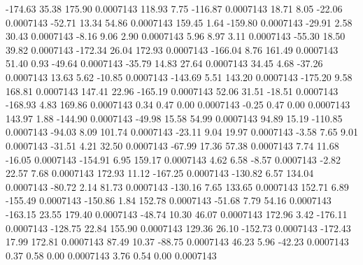      -174.63       35.38      175.90     0.0007143
      118.93        7.75     -116.87     0.0007143
       18.71        8.05      -22.06     0.0007143
      -52.71       13.34       54.86     0.0007143
      159.45        1.64     -159.80     0.0007143
      -29.91        2.58       30.43     0.0007143
       -8.16        9.06        2.90     0.0007143
        5.96        8.97        3.11     0.0007143
      -55.30       18.50       39.82     0.0007143
     -172.34       26.04      172.93     0.0007143
     -166.04        8.76      161.49     0.0007143
       51.40        0.93      -49.64     0.0007143
      -35.79       14.83       27.64     0.0007143
       34.45        4.68      -37.26     0.0007143
       13.63        5.62      -10.85     0.0007143
     -143.69        5.51      143.20     0.0007143
     -175.20        9.58      168.81     0.0007143
      147.41       22.96     -165.19     0.0007143
       52.06       31.51      -18.51     0.0007143
     -168.93        4.83      169.86     0.0007143
        0.34        0.47        0.00     0.0007143
       -0.25        0.47        0.00     0.0007143
      143.97        1.88     -144.90     0.0007143
      -49.98       15.58       54.99     0.0007143
       94.89       15.19     -110.85     0.0007143
      -94.03        8.09      101.74     0.0007143
      -23.11        9.04       19.97     0.0007143
       -3.58        7.65        9.01     0.0007143
      -31.51        4.21       32.50     0.0007143
      -67.99       17.36       57.38     0.0007143
        7.74       11.68      -16.05     0.0007143
     -154.91        6.95      159.17     0.0007143
        4.62        6.58       -8.57     0.0007143
       -2.82       22.57        7.68     0.0007143
      172.93       11.12     -167.25     0.0007143
     -130.82        6.57      134.04     0.0007143
      -80.72        2.14       81.73     0.0007143
     -130.16        7.65      133.65     0.0007143
      152.71        6.89     -155.49     0.0007143
     -150.86        1.84      152.78     0.0007143
      -51.68        7.79       54.16     0.0007143
     -163.15       23.55      179.40     0.0007143
      -48.74       10.30       46.07     0.0007143
      172.96        3.42     -176.11     0.0007143
     -128.75       22.84      155.90     0.0007143
      129.36       26.10     -152.73     0.0007143
     -172.43       17.99      172.81     0.0007143
       87.49       10.37      -88.75     0.0007143
       46.23        5.96      -42.23     0.0007143
        0.37        0.58        0.00     0.0007143
        3.76        0.54        0.00     0.0007143
